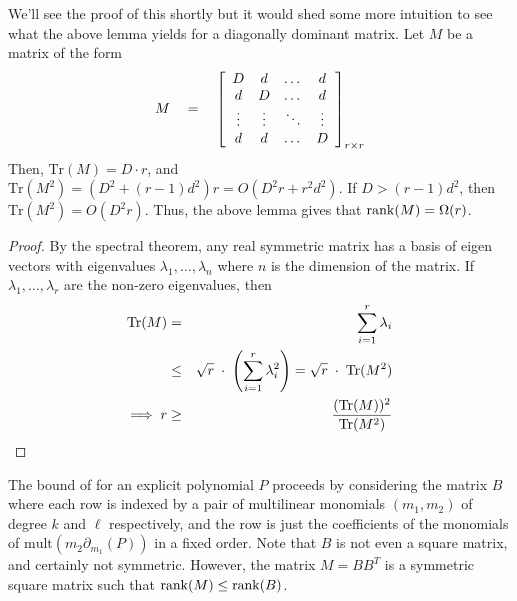 We'll see the proof of this shortly but it would shed some more intuition to see what the above lemma yields for a diagonally dominant matrix. 
Let $M$ be a matrix of the form
\[
M \quad = \quad \left[\begin{array}{cccc}
D &  d & \dots &  d\\
 d & D & \dots & d\\
\vdots & \vdots & \ddots & \vdots \\
d & d & \dots & D
\end{array}\right]_{r \times r}
\]
Then, $\mathrm{Tr}(M) = D\cdot r$, and $\mathrm{Tr}(M^2) = (D^2 + (r-1)d^2)r = O(D^2 r + r^2 d^2)$. 
If $D > (r-1)d^2$, then $\mathrm{Tr}(M^2) = O(D^2r)$. 
Thus, the above lemma gives that $\operatorname{rank}(M) = \Omega(r)$. 
\begin{proof}
By the spectral theorem, any real symmetric matrix has a basis of eigen vectors with eigenvalues $\lambda_1,\dots, \lambda_n$ where $n$ is the dimension of the matrix. 
If $\lambda_1,\dots, \lambda_r$ are the non-zero eigenvalues, then 
\begin{eqnarray*}
\mathrm{Tr}(M) &   =  & \sum_{i=1}^r \lambda_i\\
& \leq & \sqrt{r} \;\cdot \; \left(\sum_{i=1}^r \lambda_i^2\right) = \sqrt{r}\;\cdot \; \mathrm{Tr}(M^2)\\
\implies r & \geq & \frac{(\mathrm{Tr}(M))^2}{\mathrm{Tr}(M^2)}
\end{eqnarray*}
\end{proof}

The bound of \cite{KLSS} for an explicit polynomial $P$ proceeds by considering the matrix $B$ where each row is indexed by a pair of multilinear monomials $(m_1,m_2)$  of degree $k$ and $\ell$ respectively, and the row is just the coefficients of the monomials of $\mathrm{mult}(m_2 \partial_{m_1}(P))$ in a fixed order. 
Note that $B$ is not even a square matrix, and certainly not symmetric. 
However, the matrix $M = B B^T$ is a symmetric square matrix such that $\operatorname{rank}(M) \leq \operatorname{rank}(B)$. \\

